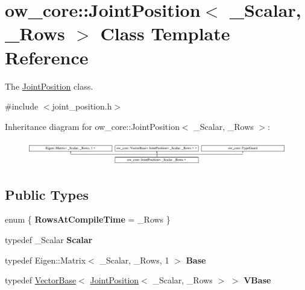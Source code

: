 \hypertarget{classow__core_1_1JointPosition}{}\section{ow\+\_\+core\+:\+:Joint\+Position$<$ \+\_\+\+Scalar, \+\_\+\+Rows $>$ Class Template Reference}
\label{classow__core_1_1JointPosition}


The \hyperlink{classow__core_1_1JointPosition}{Joint\+Position} class.  




{\ttfamily \#include $<$joint\+\_\+position.\+h$>$}

Inheritance diagram for ow\+\_\+core\+:\+:Joint\+Position$<$ \+\_\+\+Scalar, \+\_\+\+Rows $>$\+:\begin{figure}[H]
\begin{center}
\leavevmode
\includegraphics[height=1.066667cm]{da/d8e/classow__core_1_1JointPosition}
\end{center}
\end{figure}
\subsection*{Public Types}
\begin{DoxyCompactItemize}
\item 
enum \{ {\bfseries Rows\+At\+Compile\+Time} = \+\_\+\+Rows
 \}\hypertarget{classow__core_1_1JointPosition_a27951943d321636c0002c5f9c4af5d59}{}\label{classow__core_1_1JointPosition_a27951943d321636c0002c5f9c4af5d59}

\item 
typedef \+\_\+\+Scalar {\bfseries Scalar}\hypertarget{classow__core_1_1JointPosition_a1de340b233a2013396d800259b8fea54}{}\label{classow__core_1_1JointPosition_a1de340b233a2013396d800259b8fea54}

\item 
typedef Eigen\+::\+Matrix$<$ \+\_\+\+Scalar, \+\_\+\+Rows, 1 $>$ {\bfseries Base}\hypertarget{classow__core_1_1JointPosition_a94a9e8f3cc997b1cf7f29fb7d0ca70bb}{}\label{classow__core_1_1JointPosition_a94a9e8f3cc997b1cf7f29fb7d0ca70bb}

\item 
typedef \hyperlink{classow__core_1_1VectorBase}{Vector\+Base}$<$ \hyperlink{classow__core_1_1JointPosition}{Joint\+Position}$<$ \+\_\+\+Scalar, \+\_\+\+Rows $>$ $>$ {\bfseries V\+Base}\hypertarget{classow__core_1_1JointPosition_ad95d65a53ce5d15810a70cbdb163f4c7}{}\label{classow__core_1_1JointPosition_ad95d65a53ce5d15810a70cbdb163f4c7}

\end{DoxyCompactItemize}
